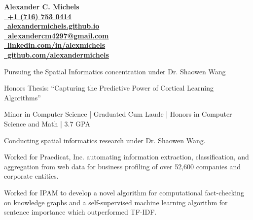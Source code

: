 \documentclass{acmresume}
\begin{document}
	
	\begin{multicols}{2}
		\vspace*{.15cm}
		\textbf{\Huge Alexander C. Michels} \\
		\columnbreak
		\hfill\href{tel:17167530414}{\faPhone~\textbf{+1 (716) 753 0414}} \\
		\hfill\href{http://alexandermichels.github.io}{\faGlobeAmericas~\textbf{alexandermichels.github.io}} \\
		\hfill\href{mailto:alexandercm4297@gmail.com}{\textbf{\faEnvelope~alexandercm4297@gmail.com}} \\ \hfill\href{https://www.linkedin.com/in/alexmichels/}{\faLinkedin~\textbf{linkedin.com/in/alexmichels}} \\
		\hfill\href{https://github.com/alexandermichels}{\faGithub~\textbf{github.com/alexandermichels}}
	\end{multicols}
	
	
		\begin{titemize}
			\item{Pursuing the Spatial Informatics concentration under Dr. Shaowen Wang}
		\end{titemize}

		\begin{titemize}
            \item Honors Thesis: ``Capturing the Predictive Power of Cortical Learning Algorithms''
			\item{Minor in Computer Science | Graduated Cum Laude | Honors in Computer Science and Math | 3.7 GPA}
		\end{titemize}
	
	
        \begin{titemize}
            \item Conducting spatial informatics research under Dr. Shaowen Wang.
        \end{titemize}
	
        \begin{titemize}
            \item{Worked for Praedicat, Inc. automating information extraction, classification, and aggregation from web data for business profiling of over 52,600 companies and corporate entities.}
            \item{Worked for IPAM to develop a novel algorithm for computational fact-checking on knowledge graphs and a self-supervised machine learning algorithm for sentence importance which outperformed TF-IDF.}
        \end{titemize}
    
\end{document}
